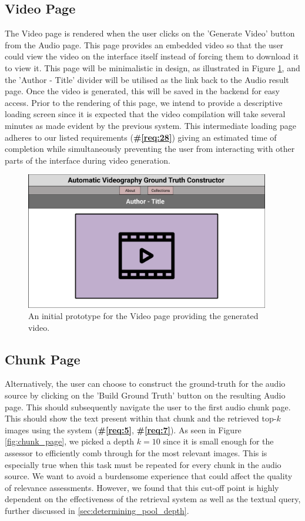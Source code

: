 \documentclass{l4proj}
\begin{document}
\subsection{Video Page}
The Video page is rendered when the user clicks on the 'Generate Video' button from the Audio page. This page provides an embedded video so that the user could view the video on the interface itself instead of forcing them to download it to view it. This page will be minimalistic in design, as illustrated in Figure \ref{fig:video_page}, and the 'Author - Title' divider will be utilised as the link back to the Audio result page. Once the video is generated, this will be saved in the backend for easy access. Prior to the rendering of this page, we intend to provide a descriptive loading screen since it is expected that the video compilation will take several minutes as made evident by the previous system. This intermediate loading page adheres to our listed requirements (\textbf{\#\ref{req:28}}) giving an estimated time of completion while simultaneously preventing the user from interacting with other parts of the interface during video generation.

\begin{figure}
    \centering
    \includegraphics[width=0.95\textwidth]{figures/video_page.pdf}
    \caption{An initial prototype for the Video page providing the generated video.}
    \label{fig:video_page}
\end{figure}

\subsection{Chunk Page}
Alternatively, the user can choose to construct the ground-truth for the audio source by clicking on the 'Build Ground Truth' button on the resulting Audio page. This should subsequently navigate the user to the first audio chunk page. This should show the text present within that chunk and the retrieved top-$k$ images using the system (\textbf{\#\ref{req:5}}, \textbf{\#\ref{req:7}}). As seen in Figure \ref{fig:chunk_page}, we picked a depth $k=10$ since it is small enough for the assessor to efficiently comb through for the most relevant images. This is especially true when this task must be repeated for every chunk in the audio source. We want to avoid a burdensome experience that could affect the quality of relevance assessments. However, we found that this cut-off point is highly dependent on the effectiveness of the retrieval system as well as the textual query, further discussed in \ref{sec:determining_pool_depth}.
\end{document}
